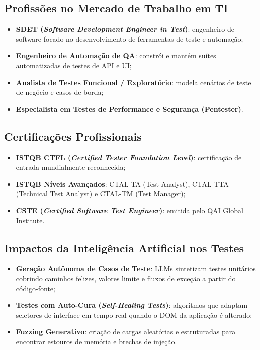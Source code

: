 \documentclass[12pt,a4paper]{article}
\begin{document}
\subsection{Profissões no Mercado de Trabalho em TI}
\begin{itemize}
    \item \textbf{SDET (\textit{Software Development Engineer in Test})}: engenheiro de software focado no desenvolvimento de ferramentas de teste e automação;
    \item \textbf{Engenheiro de Automação de QA}: constrói e mantém suítes automatizadas de testes de API e UI;
    \item \textbf{Analista de Testes Funcional / Exploratório}: modela cenários de teste de negócio e casos de borda;
    \item \textbf{Especialista em Testes de Performance e Segurança (Pentester)}.
\end{itemize}

\subsection{Certificações Profissionais}
\begin{itemize}
    \item \textbf{ISTQB CTFL (\textit{Certified Tester Foundation Level})}: certificação de entrada mundialmente reconhecida;
    \item \textbf{ISTQB Níveis Avançados}: CTAL-TA (Test Analyst), CTAL-TTA (Technical Test Analyst) e CTAL-TM (Test Manager);
    \item \textbf{CSTE (\textit{Certified Software Test Engineer})}: emitida pelo QAI Global Institute.
\end{itemize}

\subsection{Impactos da Inteligência Artificial nos Testes}
\begin{itemize}
    \item \textbf{Geração Autônoma de Casos de Teste}: LLMs sintetizam testes unitários cobrindo caminhos felizes, valores limite e fluxos de exceção a partir do código-fonte;
    \item \textbf{Testes com Auto-Cura (\textit{Self-Healing Tests})}: algoritmos que adaptam seletores de interface em tempo real quando o DOM da aplicação é alterado;
    \item \textbf{Fuzzing Generativo}: criação de cargas aleatórias e estruturadas para encontrar estouros de memória e brechas de injeção.
\end{itemize}
\end{document}
